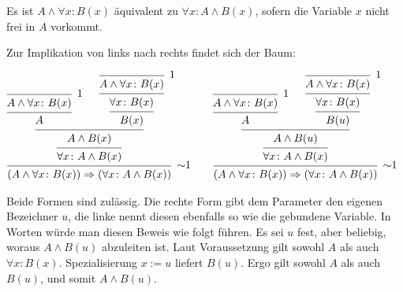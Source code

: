 \begin{Satz}
Es ist $A\land\forall x\colon B(x)$ äquivalent zu $\forall x\colon A\land B(x)$,
sofern die Variable $x$ nicht frei in $A$ vorkommt.
\end{Satz}
\begin{Beweis}
Zur Implikation von links nach rechts findet sich der Baum:
\begin{small}
\[
\begin{array}{@{}l@{\qquad}l}
\begin{prooftree}[center=false]
        \infer0[1]{A\land\forall x\colon B(x)}
      \infer1{A}
          \infer0[1]{A\land\forall x\colon B(x)}
        \infer1{\forall x\colon B(x)}
      \infer1{B(x)}
    \infer2{A\land B(x)}
  \infer1{\forall x\colon A\land B(x)}
\infer1[$\sim$1]{(A\land\forall x\colon B(x))\cond (\forall x\colon A\land B(x))}
\end{prooftree}
&
\begin{prooftree}[center=false]
        \infer0[1]{A\land\forall x\colon B(x)}
      \infer1{A}
          \infer0[1]{A\land\forall x\colon B(x)}
        \infer1{\forall x\colon B(x)}
      \infer1{B(u)}
    \infer2{A\land B(u)}
  \infer1{\forall x\colon A\land B(x)}
\infer1[$\sim$1]{(A\land\forall x\colon B(x))\cond (\forall x\colon A\land B(x))}
\end{prooftree}
\end{array}
\]
\end{small}%
Beide Formen sind zulässig. Die rechte Form gibt dem Parameter den
eigenen Bezeichner $u$, die linke nennt diesen ebenfalls so wie die
gebundene Variable. In Worten würde man diesen Beweis wie folgt
führen. Es sei $u$ fest, aber beliebig, woraus $A\land B(u)$ abzuleiten
ist. Laut Voraussetzung gilt sowohl $A$ als auch $\forall x\colon B(x)$.
Spezialisierung $x:=u$ liefert $B(u)$. Ergo gilt sowohl $A$ als
auch $B(u)$, und somit $A\land B(u)$.


\end{Beweis}
